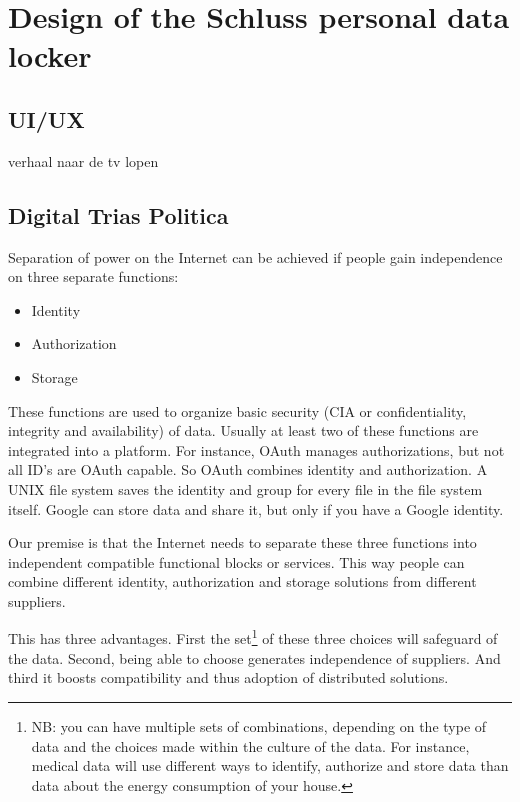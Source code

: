\documentclass{article}
\begin{document}
\section{Design of the Schluss personal data locker}
\subsection{UI/UX}
verhaal naar de tv lopen

\subsection{Digital Trias Politica}
Separation of power on the Internet can be achieved if people gain independence on three separate functions:

\begin{itemize}
    \item Identity
    \item Authorization
    \item Storage
\end{itemize}

These functions are used to organize basic security (CIA or confidentiality, integrity and availability) of data. Usually at least two of these functions are integrated into a platform. For instance, OAuth manages authorizations, but not all ID's are OAuth capable. So OAuth combines identity and authorization. A UNIX file system saves the identity and group for every file in the file system itself. Google can store data and share it, but only if you have a Google identity. 

Our premise is that the Internet needs to separate these three functions into independent compatible functional blocks or services. This way people can combine different identity, authorization and storage solutions from different suppliers.

This has three advantages. First the set\footnote{NB: you can have multiple sets of combinations, depending on the type of data and the choices made within the culture of the data. For instance, medical data will use different ways to identify, authorize and store data than data about the energy consumption of your house.} of these three choices will safeguard of the data. Second, being able to choose generates independence of suppliers. And third it boosts compatibility and thus adoption of distributed solutions.

\end{document}

